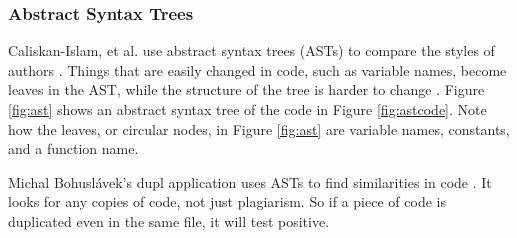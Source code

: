 \documentclass[10pt,journal,compsoc]{IEEEtran}
\begin{document}
			\subsubsection{Abstract Syntax Trees}
			Caliskan-Islam, et al. use abstract syntax trees (ASTs) to compare the styles of authors \cite{caliskan-islam+harang+liu}. Things that are easily changed in code, such as variable names, become leaves in the AST, while the structure of the tree is harder to change \cite{caliskan-islam+harang+liu}. Figure \ref{fig:ast} shows an abstract syntax tree of the code in Figure \ref{fig:astcode}. Note how the leaves, or circular nodes, in Figure \ref{fig:ast} are variable names, constants, and a function name.
		
			Michal Bohuslávek's dupl application uses ASTs to find similarities in code \cite{bohuslave}. It looks for any copies of code, not just plagiarism. So if a piece of code is duplicated even in the same file, it will test positive.
		
\end{document}
